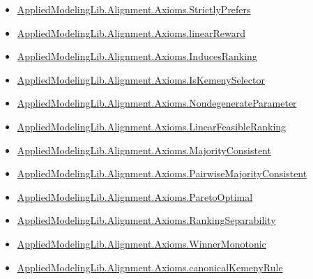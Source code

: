 \documentclass[10pt]{article}
\begin{document}
\begin{itemize}[leftmargin=1.2em]
\begin{itemize}[leftmargin=1.2em]
\item \hyperlink{library-prerequisite-191720c2353b55e9}{Applied\allowbreak{}Modeling\allowbreak{}Lib.\allowbreak{}Alignment.\allowbreak{}Axioms.\allowbreak{}Strictly\allowbreak{}Prefers}
\item \hyperlink{library-prerequisite-4a32ddda17499d70}{Applied\allowbreak{}Modeling\allowbreak{}Lib.\allowbreak{}Alignment.\allowbreak{}Axioms.\allowbreak{}linear\allowbreak{}Reward}
\item \hyperlink{library-prerequisite-b76a2acb4dafbb4d}{Applied\allowbreak{}Modeling\allowbreak{}Lib.\allowbreak{}Alignment.\allowbreak{}Axioms.\allowbreak{}Induces\allowbreak{}Ranking}
\item \hyperlink{library-prerequisite-8c9b06e1ee6dc104}{Applied\allowbreak{}Modeling\allowbreak{}Lib.\allowbreak{}Alignment.\allowbreak{}Axioms.\allowbreak{}Is\allowbreak{}Kemeny\allowbreak{}Selector}
\item \hyperlink{library-prerequisite-a68d66923a3c5526}{Applied\allowbreak{}Modeling\allowbreak{}Lib.\allowbreak{}Alignment.\allowbreak{}Axioms.\allowbreak{}Nondegenerate\allowbreak{}Parameter}
\item \hyperlink{library-prerequisite-3c30aae25bef2671}{Applied\allowbreak{}Modeling\allowbreak{}Lib.\allowbreak{}Alignment.\allowbreak{}Axioms.\allowbreak{}Linear\allowbreak{}Feasible\allowbreak{}Ranking}
\item \hyperlink{library-prerequisite-5d6a6008c423d214}{Applied\allowbreak{}Modeling\allowbreak{}Lib.\allowbreak{}Alignment.\allowbreak{}Axioms.\allowbreak{}Majority\allowbreak{}Consistent}
\item \hyperlink{library-prerequisite-e6dee3706881b80a}{Applied\allowbreak{}Modeling\allowbreak{}Lib.\allowbreak{}Alignment.\allowbreak{}Axioms.\allowbreak{}Pairwise\allowbreak{}Majority\allowbreak{}Consistent}
\item \hyperlink{library-prerequisite-80fdf9d21d096dc8}{Applied\allowbreak{}Modeling\allowbreak{}Lib.\allowbreak{}Alignment.\allowbreak{}Axioms.\allowbreak{}Pareto\allowbreak{}Optimal}
\item \hyperlink{library-prerequisite-ad3d3904c31ec7b5}{Applied\allowbreak{}Modeling\allowbreak{}Lib.\allowbreak{}Alignment.\allowbreak{}Axioms.\allowbreak{}Ranking\allowbreak{}Separability}
\item \hyperlink{library-prerequisite-2a43c1465e4fa011}{Applied\allowbreak{}Modeling\allowbreak{}Lib.\allowbreak{}Alignment.\allowbreak{}Axioms.\allowbreak{}Winner\allowbreak{}Monotonic}
\item \hyperlink{library-prerequisite-82fd59c97a4067c7}{Applied\allowbreak{}Modeling\allowbreak{}Lib.\allowbreak{}Alignment.\allowbreak{}Axioms.\allowbreak{}canonical\allowbreak{}Kemeny\allowbreak{}Rule}

\end{itemize}
\end{itemize}
\end{document}
